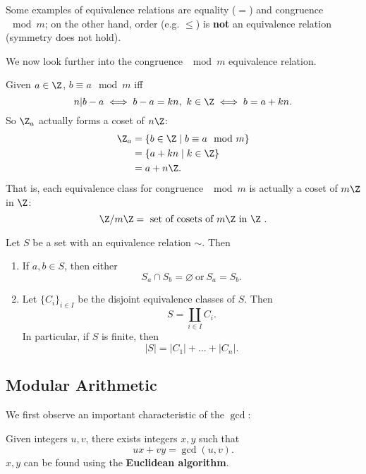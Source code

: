 \documentclass[math1530-lecture-notes]{subfiles}
\begin{document}
Some examples of equivalence relations are equality ($=$) and congruence $\mod{m}$; on the other
hand, order (e.g. $\le $) is \textbf{not} an equivalence relation (symmetry does not hold).

We now look further into the congruence $\mod{m}$ equivalence relation.

\begin{example}
  Given $a \in \Z$, $b \equiv a\mod{m}$ iff \[
    n | b-a \iff b - a = kn,\ k\in \Z \iff b = a + kn
  .\] So $\Z_a$ actually forms a coset of $n\Z$:
  \begin{align*}
    \Z_a &= \{b\in \Z\mid b\equiv a\mod{m}\}  \\
    &= \{a+kn\mid k\in \Z\}  \\
    &= a+n\Z
  .\end{align*}
  That is, each equivalence class for congruence $\mod{m}$ is actually a coset of $m\Z$ in $\Z$: \[
    \Z / m\Z = ~\text{set of cosets of $m\Z$ in $\Z$}~
  .\] 
\end{example}

\begin{theorem}[]{}
  Let $S$ be a set with an equivalence relation $\sim $. Then
  \begin{enumerate}
    \item If $a,b\in S$, then either \[
        S_a \cap S_b = \varnothing ~\text{or}~ S_a = S_b
      .\] 
    \item Let $\{ C_i \}_{i\in I}$ be the disjoint equivalence classes of $S$. Then \[
        S = \coprod_{i\in I}C_i
      .\] In particular, if $S$ is finite, then \[
        \left| S \right| = \left| C_1 \right|+ \ldots+\left| C_n \right|  
      .\] 
  \end{enumerate}
\end{theorem}

\subsection{Modular Arithmetic}

We first observe an important characteristic of the $\gcd$:
\begin{proposition}[]{}
  Given integers $u,v$, there exists integers $x,y$ such that \[
    ux+vy = \gcd{(u, v)}
  .\] $x,y$ can be found using the \textbf{Euclidean algorithm}.
\end{proposition}
\end{document}
